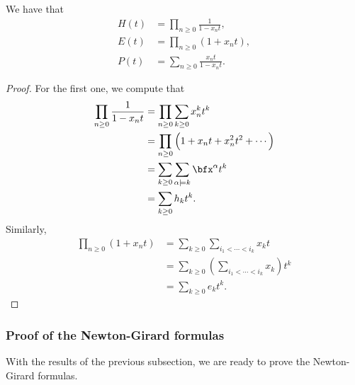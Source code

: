 \documentclass{article}
\begin{document}
\begin{theorem}\label{thm:HEPPowerSeries}
    We have that
    \begin{align*}
        H(t) &= \prod_{n\geq0}\frac{1}{1-x_nt}, \\
        E(t) &= \prod_{n\geq0}(1+x_nt), \\
        P(t) &= \sum_{n\geq0}\frac{x_nt}{1-x_nt}.
    \end{align*}
\end{theorem}

\begin{proof}
    For the first one, we compute that
    \begin{align*}
        \prod_{n\geq0}\frac{1}{1-x_nt} &= \prod_{n\geq0}\sum_{k\geq0}x_n^kt^k\\
                                        &= \prod_{n \geq 0}\Big(1 + x_nt + x_n^2t^2 + \cdots\Big) \\
                                        &= \sum_{k \geq 0}\sum_{\alpha \models k} \bfx^\alpha t^k \\
                                        &= \sum_{k \geq 0} h_kt^k.
    \end{align*}
    Similarly,
    \begin{align*}
        \prod_{n\geq0}(1+x_nt) 
        &=
        \sum_{k \geq 0}
        \sum_{i_1 < \cdots < i_k}
        x_k
        t
        \\
        &= 
        \sum_{k \geq 0}
        \left(
            \sum_{i_1 < \cdots < i_k}
            x_k
        \right)
        t^k
        \\
        &=
        \sum_{k \geq 0}
        e_kt^k.
    \end{align*}
\end{proof}

\subsubsection{Proof of the Newton-Girard formulas}

With the results of the previous subsection, we are ready to prove the Newton-Girard formulas.
\end{document}
